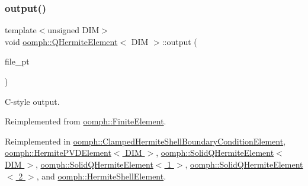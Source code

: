 \mbox{\label{classoomph_1_1QHermiteElement_ae69bd9e9d2e2e90ff3116995483b87dd}} 
\subsubsection{\texorpdfstring{output()}{output()}\hspace{0.1cm}{\footnotesize\ttfamily [7/12]}}
{\footnotesize\ttfamily template$<$unsigned D\+IM$>$ \\
void \hyperlink{classoomph_1_1QHermiteElement}{oomph\+::\+Q\+Hermite\+Element}$<$ D\+IM $>$\+::output (\begin{DoxyParamCaption}\item[{F\+I\+LE $\ast$}]{file\+\_\+pt }\end{DoxyParamCaption})\hspace{0.3cm}{\ttfamily [virtual]}}



C-\/style output. 



Reimplemented from \hyperlink{classoomph_1_1FiniteElement_a72cddd09f8ddbee1a20a1ff404c6943e}{oomph\+::\+Finite\+Element}.



Reimplemented in \hyperlink{classoomph_1_1ClampedHermiteShellBoundaryConditionElement_af1b8f1785d656386e36a01336611a22d}{oomph\+::\+Clamped\+Hermite\+Shell\+Boundary\+Condition\+Element}, \hyperlink{classoomph_1_1HermitePVDElement_a5567656681b134890e6940972a2461d5}{oomph\+::\+Hermite\+P\+V\+D\+Element$<$ D\+I\+M $>$}, \hyperlink{classoomph_1_1SolidQHermiteElement_ae4f251ca932301e92e1b897cec6f0459}{oomph\+::\+Solid\+Q\+Hermite\+Element$<$ D\+I\+M $>$}, \hyperlink{classoomph_1_1SolidQHermiteElement_ae4f251ca932301e92e1b897cec6f0459}{oomph\+::\+Solid\+Q\+Hermite\+Element$<$ 1 $>$}, \hyperlink{classoomph_1_1SolidQHermiteElement_ae4f251ca932301e92e1b897cec6f0459}{oomph\+::\+Solid\+Q\+Hermite\+Element$<$ 2 $>$}, and \hyperlink{classoomph_1_1HermiteShellElement_a126ebcc503395e036c6bfaf8fabbc800}{oomph\+::\+Hermite\+Shell\+Element}.

\mbox{\label{classoomph_1_1QHermiteElement_a12a4346480e45d82cbfca1f324cd4878}} 
